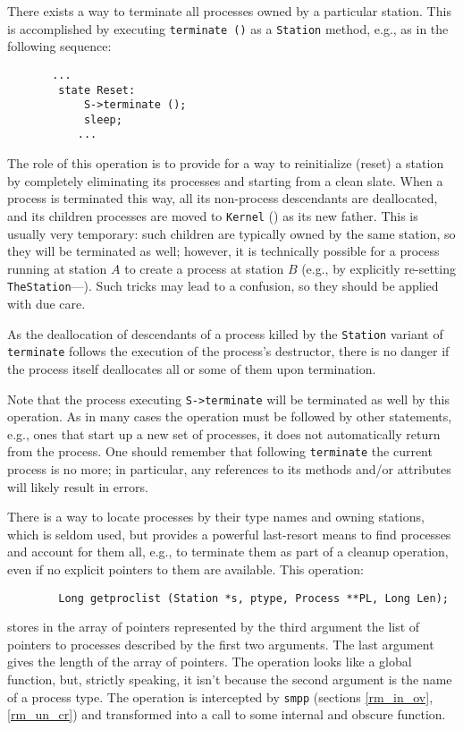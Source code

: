 There exists a way to terminate all processes owned by a particular station.
This is accomplished by executing {\tt terminate ()} as a {\tt Station}
method, e.g., as in the following sequence:
\begin{verbatim}
       ...
        state Reset:
            S->terminate ();
            sleep;
           ...
\end{verbatim}
The role of this operation is to provide for a way to reinitialize (reset)
a station
by completely eliminating its processes and starting from a clean slate.
When a process is terminated this way, all its non-process descendants are
deallocated, and its children processes are moved to {\tt Kernel}
() as its new father.
This is usually very temporary: such children are typically owned by the
same station, so they will be terminated as well; however, it is technically
possible for a process running at station $A$ to create a process at station
$B$ (e.g., by explicitly re-setting {\tt TheStation}---).
Such tricks may lead to a confusion, so they should be applied with due care.

As the deallocation of descendants of a process killed by the {\tt Station}
variant of {\tt terminate} follows the execution of the process's
destructor, there is no danger if the process itself deallocates all or
some of them upon termination.

Note that the process executing {\tt S->terminate} will be terminated as well
by this operation.
As in many cases the operation must be followed by other statements, e.g.,
ones that
start up a new set of processes, it does not automatically return from the
process.
One should remember that following {\tt terminate} the current
process is no more;
in particular, any references to its methods and/or attributes will likely
result in errors.

There is a way to locate processes by their type names and owning stations,
which is seldom used, but provides a powerful last-resort means to find 
processes and account for them all, e.g., to terminate them as part of a
cleanup operation, even if no explicit pointers to them are available.
This operation:
\begin{verbatim}
        Long getproclist (Station *s, ptype, Process **PL, Long Len);
\end{verbatim}
\noindent
stores in the array of pointers represented by the third argument the list
of pointers to processes described by the first two arguments.
The last argument gives the length of the array of pointers.
The operation looks like a global function, but, strictly speaking, it isn't
because the second argument is the name of a process type.
The operation is intercepted by {\tt smpp}
(sections \ref{rm_in_ov}, \ref{rm_un_cr}) and transformed into a call to some
internal and obscure function.

